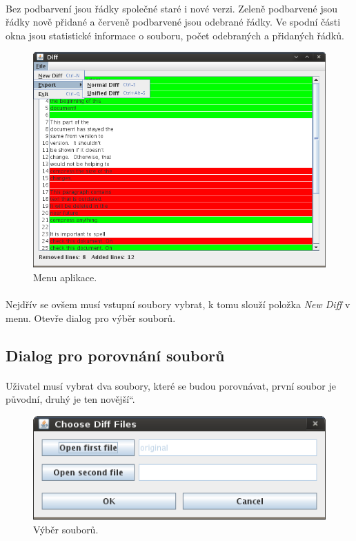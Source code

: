 \documentclass[11pt]{article}
\newcommand\uv[1]{\quotedblbase #1\textquotedblleft}%
\begin{document}
\paragraph{}
Bez podbarvení jsou řádky společné staré i nové verzi. Zeleně podbarvené 
jsou řádky nově přidané a červeně podbarvené jsou odebrané řádky. Ve spodní
části okna jsou statistické informace o souboru, počet odebraných a 
přidaných řádků.

\begin{figure}[H]
\centering
\includegraphics[scale=0.6]{scr2.png}
\caption{Menu aplikace.}
\end{figure}

\paragraph{}
Nejdřív se ovšem musí vstupní soubory vybrat, k tomu slouží položka 
{\em New Diff} v menu. Otevře dialog pro výběr souborů.

\subsection{Dialog pro porovnání souborů}

\paragraph{}
Uživatel musí vybrat dva soubory, které se budou porovnávat, první soubor je
původní, druhý je ten \uv{novější}.

\begin{figure}[H]
\centering
\includegraphics[scale=0.6]{scr3.png}
\caption{Výběr souborů.}
\end{figure}
\end{document}

